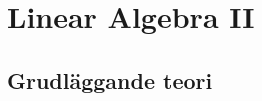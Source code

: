 \chapter{Linear Algebra II}
\newcommand{\imagesLaII}{image/chap8_laII}

\newpage



\begin{multicols}{2}
\section{Grudläggande teori} %

\end{multicols}
